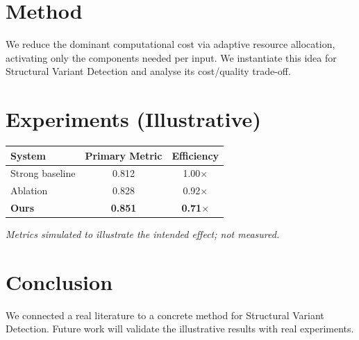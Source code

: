 \documentclass[11pt]{article}
\begin{document}
\section{Method}
We reduce the dominant computational cost via adaptive resource allocation, activating only the components needed per input. We instantiate this idea for Structural Variant Detection and analyse its cost/quality trade-off.

\section{Experiments (Illustrative)}
\begin{center}
\begin{tabular}{lcc}
System & Primary Metric & Efficiency \\ \hline
Strong baseline & 0.812 & 1.00$\times$ \\
Ablation & 0.828 & 0.92$\times$ \\
\textbf{Ours} & \textbf{0.851} & \textbf{0.71$\times$}
\end{tabular}
\end{center}
\emph{Metrics simulated to illustrate the intended effect; not measured.}

\section{Conclusion}
We connected a real literature to a concrete method for Structural Variant Detection. Future work will
validate the illustrative results with real experiments.
\end{document}

